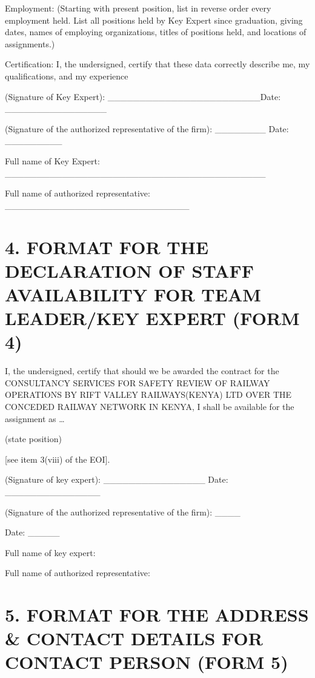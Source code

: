 Employment: (Starting with present position, list in reverse order every
employment held. List all positions held by Key Expert since graduation,
giving dates, names of employing organizations, titles of positions
held, and locations of assignments.)

Certification: I, the undersigned, certify that these data correctly
describe me, my qualifications, and my experience

(Signature of Key Expert):
\_\_\_\_\_\_\_\_\_\_\_\_\_\_\_\_\_\_\_\_\_\_\_\_Date:
\_\_\_\_\_\_\_\_\_\_\_\_\_\_\_\_

(Signature of the authorized representative of the firm):
\_\_\_\_\_\_\_\_ Date: \_\_\_\_\_\_\_\_\_

Full name of Key Expert:
\_\_\_\_\_\_\_\_\_\_\_\_\_\_\_\_\_\_\_\_\_\_\_\_\_\_\_\_\_\_\_\_\_\_\_\_\_\_\_\_\_

Full name of authorized representative:
\_\_\_\_\_\_\_\_\_\_\_\_\_\_\_\_\_\_\_\_\_\_\_\_\_\_\_\_\_

\section{4. FORMAT FOR THE DECLARATION OF STAFF AVAILABILITY FOR TEAM
	LEADER/KEY EXPERT (FORM
	4)}\label{format-for-the-declaration-of-staff-availability-for-team-leaderkey-expert-form-4}

I, the undersigned, certify that should we be awarded the contract for
the CONSULTANCY SERVICES FOR SAFETY REVIEW OF RAILWAY OPERATIONS BY RIFT
VALLEY RAILWAYS(KENYA) LTD OVER THE CONCEDED RAILWAY NETWORK IN KENYA, I
shall be available for the assignment as \ldots{}

(state position)

{[}see item 3(viii) of the EOI{]}.

(Signature of key expert): \_\_\_\_\_\_\_\_\_\_\_\_\_\_\_\_ Date:
\_\_\_\_\_\_\_\_\_\_\_\_\_\_\_

(Signature of the authorized representative of the firm): \_\_\_\_

Date: \_\_\_\_\_

Full name of key expert:

Full name of authorized representative:

\section{5. FORMAT FOR THE ADDRESS \& CONTACT DETAILS FOR CONTACT PERSON
	(FORM
	5)}\label{format-for-the-address-contact-details-for-contact-person-form-5}

